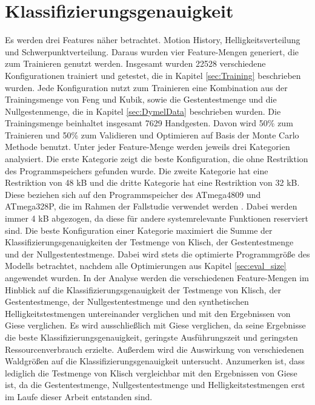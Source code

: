 \section{Klassifizierungsgenauigkeit}
Es werden drei Features näher betrachtet. Motion History, Helligkeitsverteilung und Schwerpunktverteilung. Daraus wurden vier Feature-Mengen generiert, die zum Trainieren genutzt werden. Insgesamt wurden 22528
verschiedene Konfigurationen trainiert und getestet, die in Kapitel \ref{sec:Training} beschrieben wurden. Jede Konfiguration nutzt zum Trainieren eine Kombination aus der Trainingsmenge von Feng und Kubik,
sowie die Gestentestmenge und die Nullgestenmenge, die in Kapitel \ref{sec:DymelData} beschrieben wurden. Die Trainingsmenge beinhaltet insgesamt 7629 Handgesten. Davon wird 50\% zum Trainieren und 50\% zum
Validieren und Optimieren auf Basis der Monte Carlo Methode benutzt.
\newline
\newline
Unter jeder Feature-Menge werden jeweils drei Kategorien analysiert. Die erste Kategorie zeigt die beste Konfiguration, die ohne Restriktion des Programmspeichers gefunden wurde. Die zweite Kategorie hat eine Restriktion
von 48 kB und die dritte Kategorie hat eine Restriktion von 32 kB. Diese beziehen sich auf den Programmspeicher des ATmega4809 und ATmega328P, die im Rahmen der Fallstudie verwendet werden \cite{venzkeArticle}.
Dabei werden immer 4 kB abgezogen, da diese für andere systemrelevante Funktionen reserviert sind. Die beste Konfiguration einer Kategorie maximiert die Summe
der Klassifizierungsgenauigkeiten der Testmenge von Klisch, der Gestentestmenge und der Nullgestentestmenge. Dabei wird stets die optimierte Programmgröße des Modells betrachtet,
nachdem alle Optimierungen aus Kapitel \ref{sec:eval_size} angewendet wurden.
\newline
\newline
In der Analyse werden die verschiedenen Feature-Mengen im Hinblick auf die Klassifizierungsgenauigkeit der Testmenge von Klisch, der Gestentestmenge, der Nullgestentestmenge und den synthetischen
Helligkeitstestmengen untereinander verglichen und mit den Ergebnissen von Giese verglichen. Es wird ausschließlich mit Giese verglichen, da seine Ergebnisse die beste Klassifizierungsgenauigkeit,
geringste Ausführungszeit und geringsten Ressourcenverbrauch erzielte. Außerdem wird die Auswirkung von verschiedenen Waldgrößen auf die Klassifizierungsgenauigkeit untersucht. Anzumerken ist, dass
lediglich die Testmenge von Klisch vergleichbar mit den Ergebnissen von Giese ist, da die Gestentestmenge, Nullgestentestmenge und Helligkeitstestmengen erst im Laufe dieser Arbeit entstanden sind.







